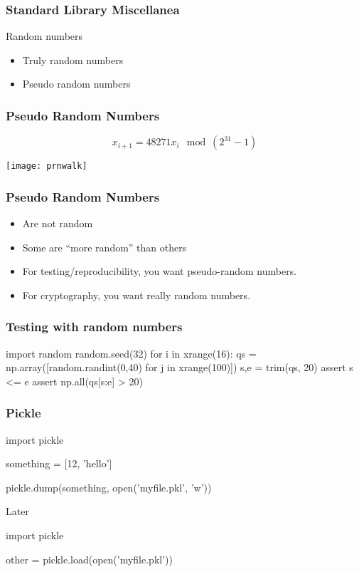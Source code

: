 \begin{frame}[fragile]
\frametitle{Standard Library Miscellanea}
Random numbers
\begin{itemize}
\item Truly random numbers
\item Pseudo random numbers
\end{itemize}
\end{frame}

\begin{frame}[fragile]
\frametitle{Pseudo Random Numbers}

\[
x_{i+1} = 48271 x_i \mod (2^{31}-1)
\]

\centering
\texttt{[image: prnwalk]}

\end{frame}

\begin{frame}[fragile]
\frametitle{Pseudo Random Numbers}
\begin{itemize}
\item Are not random
\item Some are ``more random'' than others
\end{itemize}
\pause

\begin{itemize}
\item For testing/reproducibility, you want \alert{pseudo-}random numbers.
\item For cryptography, you want really random numbers.
\end{itemize}
\end{frame}

\begin{frame}[fragile]
\frametitle{Testing with random numbers}

\begin{python}
import random
random.seed(32)
for i in xrange(16):
    qs = np.array([random.randint(0,40) for j in xrange(100)])
    s,e = trim(qs, 20)
    assert s <= e
    assert np.all(qs[s:e] > 20)
\end{python}
\end{frame}

\begin{frame}[fragile]
\frametitle{Pickle}

\begin{python}
import pickle

something = [12, 'hello']

pickle.dump(something, open('myfile.pkl', 'w'))
\end{python}

Later

\begin{python}
import pickle

other = pickle.load(open('myfile.pkl'))
\end{python}
\end{frame}

